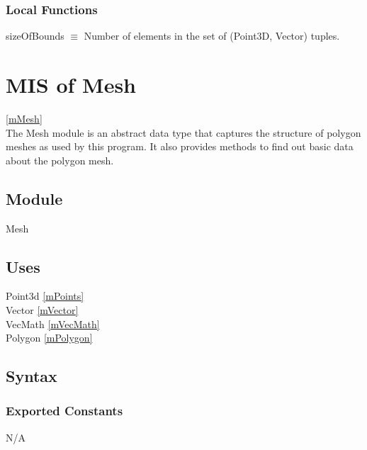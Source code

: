 \documentclass[12pt, titlepage]{article}
\begin{document}
\subsubsection{Local Functions}
sizeOfBounds $\equiv$ Number of elements in the set of (Point3D, Vector) 
tuples.\\


\newpage


\section{MIS of Mesh} \ref{mMesh} \\
The Mesh module is an abstract data type that captures the structure of polygon 
meshes as used by this program. It also provides methods to find out basic data 
about the polygon mesh.

\subsection{Module}
Mesh

\subsection{Uses}
Point3d \ref{mPoints} \\
Vector \ref{mVector}\\
VecMath \ref{mVecMath}\\
Polygon \ref{mPolygon}\\

\subsection{Syntax}
\subsubsection{Exported Constants}
N/A
\end{document}
